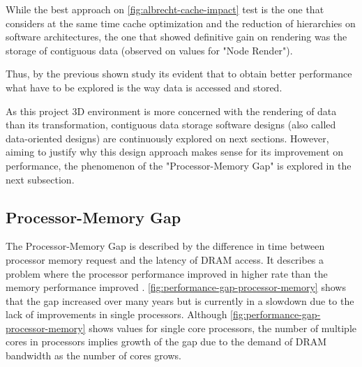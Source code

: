     While the best approach on \autoref{fig:albrecht-cache-impact} test is the one that considers at the same time cache optimization and the reduction of hierarchies on software architectures, the one that showed definitive gain on rendering was the storage of contiguous data (observed on values for "Node Render"). 
    
    Thus, by the previous shown study its evident that to obtain better performance what have to be explored is the way data is accessed and stored. 
    
    As this project 3D environment is more concerned with the rendering of data than its transformation, contiguous data storage software designs (also called data-oriented designs) are continuously explored on next sections. However, aiming to justify why this design approach makes sense for its improvement on performance, the phenomenon of the "Processor-Memory Gap" is explored in the next subsection.

\subsection{Processor-Memory Gap}
    
    The Processor-Memory Gap is described by the difference in time between processor memory request and the latency of DRAM access. It describes a problem where the processor performance improved in higher rate than the memory performance improved \cite{computer-architecture-a-quantitative-approach-6ed}. \autoref{fig:performance-gap-processor-memory} shows that the gap increased over many years but is currently in a slowdown due to the lack of improvements in single processors. Although \autoref{fig:performance-gap-processor-memory} shows values for single core processors, the number of multiple cores in processors implies growth of the gap due to the demand of DRAM bandwidth as the number of cores grows.
    
